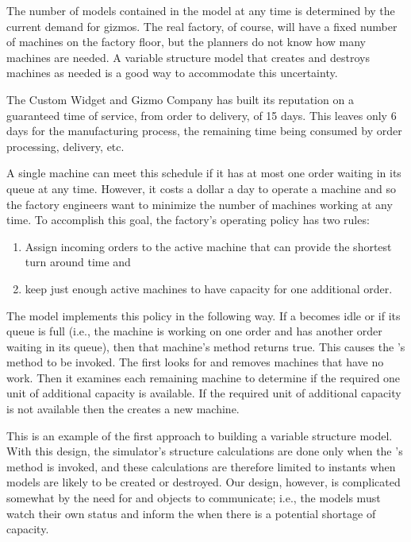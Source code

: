 The number of  models contained in the  model at any time is determined by the current demand for gizmos. The real factory, of course, will have a fixed number of machines on the factory floor, but the planners do not know how many machines are needed. A variable structure model that creates and destroys machines as needed is a good way to accommodate this uncertainty. 

The Custom Widget and Gizmo Company has built its reputation on a guaranteed time of service, from order to delivery, of 15 days. This leaves only 6 days for the manufacturing process, the remaining time being consumed by order processing, delivery, etc. 

A single machine can meet this schedule if it has at most one order waiting in its queue at any time. However, it costs a dollar a day to operate a machine and so the factory engineers want to minimize the number of machines working at any time. To accomplish this goal, the factory's operating policy has two rules:
\begin{enumerate}
\item Assign incoming orders to the active machine that can provide the shortest turn around time and
\item keep just enough active machines to have capacity for one additional order.
\end{enumerate}

The  model implements this policy in the following way. If a  becomes idle or if its queue is full (i.e., the machine is working on one order and has another order waiting in its queue), then that machine's  method returns true. This causes the 's  method to be invoked. The  first looks for and removes machines that have no work. Then it examines each remaining machine to determine if the required one unit of additional capacity is available. If the required unit of additional capacity is not available then the  creates a new machine.

This is an example of the first approach to building a variable structure model. With this design, the simulator's structure calculations are done only when the 's  method is invoked, and these calculations are therefore limited to instants when  models are likely to be created or destroyed. Our design, however, is complicated somewhat by the need for  and  objects to communicate; i.e., the  models must watch their own status and inform the  when there is a potential shortage of capacity.

